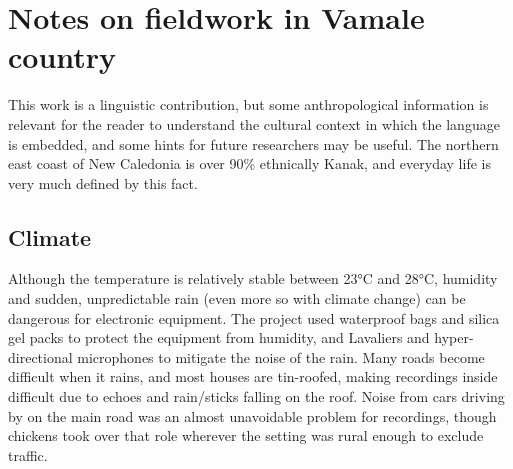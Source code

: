 \section{Notes on fieldwork in Vamale country}
\label{sec:Field}
This work is a linguistic contribution, but some anthropological information is relevant for the reader to understand the cultural context in which the language is embedded, and some hints for future researchers may be useful. The northern east coast of New Caledonia is over 90\% ethnically Kanak, and everyday life is very much defined by this fact. %
\subsection{Climate}
Although the temperature is relatively stable between 23°C and 28°C, humidity and sudden, unpredictable rain (even more so with climate change) can be dangerous for electronic equipment. The project used waterproof bags and silica gel packs to protect the equipment from humidity, and Lavaliers and hyper-directional microphones to mitigate the noise of the rain. Many roads become difficult when it rains, and most houses are tin-roofed, making recordings inside difficult due to echoes and rain/sticks falling on the roof. Noise from cars driving by on the main road was an almost unavoidable problem for recordings, though chickens took over that role wherever the setting was rural enough to exclude traffic.

